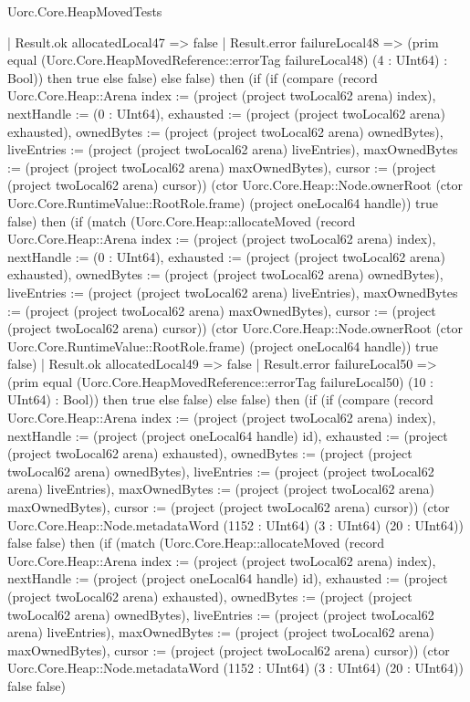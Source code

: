 \begin{lexlean}{Uorc.Core.HeapMovedTests}
\begin{semanticmodule}
{        | Result.ok allocatedLocal47 => false
        | Result.error failureLocal48 => (prim equal (Uorc.Core.HeapMovedReference::errorTag failureLocal48) (4 : UInt64) : Bool)) then true else false) else false) then (if (if (compare (record Uorc.Core.Heap::Arena {index := (project (project twoLocal62 arena) index), nextHandle := (0 : UInt64), exhausted := (project (project twoLocal62 arena) exhausted), ownedBytes := (project (project twoLocal62 arena) ownedBytes), liveEntries := (project (project twoLocal62 arena) liveEntries), maxOwnedBytes := (project (project twoLocal62 arena) maxOwnedBytes), cursor := (project (project twoLocal62 arena) cursor)}) (ctor Uorc.Core.Heap::Node.ownerRoot (ctor Uorc.Core.RuntimeValue::RootRole.frame) (project oneLocal64 handle)) true false) then (if (match (Uorc.Core.Heap::allocateMoved (record Uorc.Core.Heap::Arena {index := (project (project twoLocal62 arena) index), nextHandle := (0 : UInt64), exhausted := (project (project twoLocal62 arena) exhausted), ownedBytes := (project (project twoLocal62 arena) ownedBytes), liveEntries := (project (project twoLocal62 arena) liveEntries), maxOwnedBytes := (project (project twoLocal62 arena) maxOwnedBytes), cursor := (project (project twoLocal62 arena) cursor)}) (ctor Uorc.Core.Heap::Node.ownerRoot (ctor Uorc.Core.RuntimeValue::RootRole.frame) (project oneLocal64 handle)) true false)
        | Result.ok allocatedLocal49 => false
        | Result.error failureLocal50 => (prim equal (Uorc.Core.HeapMovedReference::errorTag failureLocal50) (10 : UInt64) : Bool)) then true else false) else false) then (if (if (compare (record Uorc.Core.Heap::Arena {index := (project (project twoLocal62 arena) index), nextHandle := (project (project oneLocal64 handle) id), exhausted := (project (project twoLocal62 arena) exhausted), ownedBytes := (project (project twoLocal62 arena) ownedBytes), liveEntries := (project (project twoLocal62 arena) liveEntries), maxOwnedBytes := (project (project twoLocal62 arena) maxOwnedBytes), cursor := (project (project twoLocal62 arena) cursor)}) (ctor Uorc.Core.Heap::Node.metadataWord (1152 : UInt64) (3 : UInt64) (20 : UInt64)) false false) then (if (match (Uorc.Core.Heap::allocateMoved (record Uorc.Core.Heap::Arena {index := (project (project twoLocal62 arena) index), nextHandle := (project (project oneLocal64 handle) id), exhausted := (project (project twoLocal62 arena) exhausted), ownedBytes := (project (project twoLocal62 arena) ownedBytes), liveEntries := (project (project twoLocal62 arena) liveEntries), maxOwnedBytes := (project (project twoLocal62 arena) maxOwnedBytes), cursor := (project (project twoLocal62 arena) cursor)}) (ctor Uorc.Core.Heap::Node.metadataWord (1152 : UInt64) (3 : UInt64) (20 : UInt64)) false false)
}
\end{semanticmodule}
\end{lexlean}
